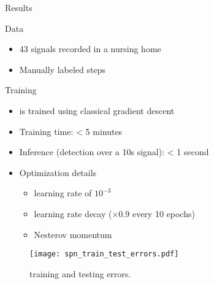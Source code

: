 \begin{frame}{Results}
\begin{minipage}[t]{0.45\linewidth}
    Data
    \begin{itemize}
        \item 43 signals recorded in a nursing home
        \item Manually labeled steps
    \end{itemize}
    Training
    \begin{itemize}
        \item \subalgo is trained using classical gradient descent
        \item Training time: < 5 minutes
        \item Inference (detection over a 10s signal): < 1 second
        \item Optimization details
        \begin{itemize}
            \item learning rate of $10^{-3}$
            \item learning rate decay ($\times 0.9$ every 10 epochs)
            \item Nesterov momentum
        \end{itemize}
    \end{itemize}
\end{minipage}\hfill
\begin{minipage}[t]{0.5\linewidth}
    \begin{figure}[h]
            \centering
            \texttt{[image: spn\_train\_test\_errors.pdf]}
        \caption{\subalgo training and testing errors.}
    \end{figure}
\end{minipage}
\end{frame}


